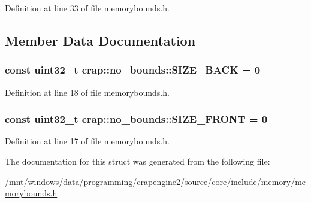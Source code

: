 Definition at line 33 of file memorybounds.\+h.



\subsection{Member Data Documentation}
\hypertarget{structcrap_1_1no__bounds_af9c6959f51073f04ba5a9c7afd1ae5a6}{
\subsubsection[{S\+I\+Z\+E\+\_\+\+B\+A\+C\+K}]{\setlength{\rightskip}{0pt plus 5cm}const uint32\+\_\+t crap\+::no\+\_\+bounds\+::\+S\+I\+Z\+E\+\_\+\+B\+A\+C\+K = 0\hspace{0.3cm}{\ttfamily [static]}}}\label{structcrap_1_1no__bounds_af9c6959f51073f04ba5a9c7afd1ae5a6}


Definition at line 18 of file memorybounds.\+h.

\hypertarget{structcrap_1_1no__bounds_a54eb57eb2eb31dfe9a285d5dcc3663e0}{
\subsubsection[{S\+I\+Z\+E\+\_\+\+F\+R\+O\+N\+T}]{\setlength{\rightskip}{0pt plus 5cm}const uint32\+\_\+t crap\+::no\+\_\+bounds\+::\+S\+I\+Z\+E\+\_\+\+F\+R\+O\+N\+T = 0\hspace{0.3cm}{\ttfamily [static]}}}\label{structcrap_1_1no__bounds_a54eb57eb2eb31dfe9a285d5dcc3663e0}


Definition at line 17 of file memorybounds.\+h.



The documentation for this struct was generated from the following file\+:\begin{DoxyCompactItemize}
\item 
/mnt/windows/data/programming/crapengine2/source/core/include/memory/\hyperlink{memorybounds_8h}{memorybounds.\+h}\end{DoxyCompactItemize}
